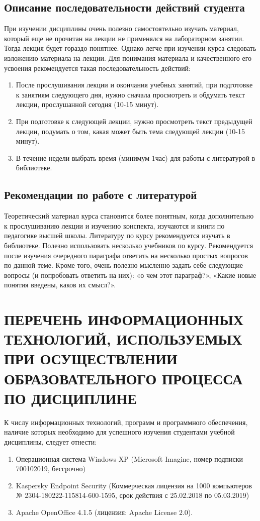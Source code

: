 \section{Описание последовательности действий студента}
При изучении дисциплины очень полезно самостоятельно изучать материал, который еще не прочитан на лекции не применялся на лабораторном занятии. Тогда лекция будет гораздо понятнее. Однако легче при изучении курса следовать изложению материала на лекции. Для понимания материала и качественного его усвоения рекомендуется такая последовательность действий:
\begin{enumerate}
\item После прослушивания лекции и окончания учебных занятий, при подготовке к занятиям следующего дня, нужно сначала просмотреть и обдумать текст лекции, прослушанной сегодня (10-15 минут).
\item При подготовке к следующей лекции, нужно просмотреть текст предыдущей лекции, подумать о том, какая может быть тема следующей лекции (10-15 минут).
\item В течение недели выбрать время (минимум 1час) для работы с литературой в библиотеке.
\end{enumerate}
\section{Рекомендации по работе с литературой}
Теоретический материал курса становится более понятным, когда дополнительно к прослушиванию лекции и изучению конспекта, изучаются и книги по педагогике высшей школы. Литературу по курсу рекомендуется изучать в библиотеке. Полезно использовать несколько учебников по курсу. Рекомендуется после изучения очередного параграфа ответить на несколько простых вопросов по данной теме. Кроме того, очень полезно мысленно задать себе следующие вопросы (и попробовать ответить на них): «о чем этот параграф?», «Какие новые понятия введены, каков их смысл?».

\chapter{ПЕРЕЧЕНЬ ИНФОРМАЦИОННЫХ ТЕХНОЛОГИЙ, ИСПОЛЬЗУЕМЫХ ПРИ ОСУЩЕСТВЛЕНИИ ОБРАЗОВАТЕЛЬНОГО ПРОЦЕССА ПО ДИСЦИПЛИНЕ}
\label{chapt10}

К числу информационных технологий, программ и программного обеспечения, наличие которых необходимо для успешного изучения студентами учебной дисциплины, следует отнести:
\begin{enumerate}
\item Операционная система Windows XP (Microsoft Imagine, номер подписки 700102019, бессрочно)
\item Kaspersky Endpoint Security (Коммерческая лицензия на 1000 компьютеров № 2304-180222-115814-600-1595, срок действия с 25.02.2018 по 05.03.2019)
\item Apache OpenOffice 4.1.5 (лицензия: Apache License 2.0).
\end{enumerate}

